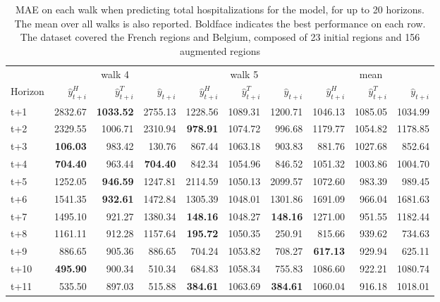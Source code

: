 \begin{table}[H]
\centering
\caption{MAE on each walk when predicting total hospitalizations for the model, for up to 20 horizons. The mean over all walks is also reported. Boldface indicates the best performance on each row. The dataset covered the French regions and Belgium, composed of 23 initial regions and 156 augmented regions }
\label{tab:MAE_walk_assemble}
\begin{tabular}{lrrrrrrrrr}
\toprule
 & \multicolumn{3}{c}{walk 4} & \multicolumn{3}{c}{walk 5} & \multicolumn{3}{c}{mean} 
\\

\cmidrule(lr){2-4} \cmidrule(lr){5-7} \cmidrule(lr){8-10} 
Horizon & $\hat{y}_{t+i}^H$ & $\hat{y}_{t+i}^T$ & $\hat{y}_{t+i}$ & $\hat{y}_{t+i}^H$ & $\hat{y}_{t+i}^T$ & $\hat{y}_{t+i}$ & $\hat{y}_{t+i}^H$ & $\hat{y}_{t+i}^T$ & $\hat{y}_{t+i}$ \\
\midrule
t+1  & 2832.67  & \textbf{1033.52}  & 2755.13  & 1228.56  & 1089.31  & 1200.71  & 1046.13  & 1085.05  & 1034.99  \\
t+2  & 2329.55  & 1006.71  & 2310.94  & \textbf{978.91}  & 1074.72  & 996.68  & 1179.77  & 1054.82  & 1178.85  \\
t+3  & \textbf{106.03}  & 983.42  & 130.76  & 867.44  & 1063.18  & 903.83  & 881.76  & 1027.68  & 852.64  \\
t+4  & \textbf{704.40}  & 963.44  & \textbf{704.40}  & 842.34  & 1054.96  & 846.52  & 1051.32  & 1003.86  & 1004.70  \\
t+5  & 1252.05  & \textbf{946.59}  & 1247.81  & 2114.59  & 1050.13  & 2099.57  & 1072.60  & 983.39  & 989.45  \\
t+6  & 1541.35  & \textbf{932.61}  & 1472.84  & 1305.39  & 1048.01  & 1301.86  & 1691.09  & 966.04  & 1681.63  \\
t+7  & 1495.10  & 921.27  & 1380.34  & \textbf{148.16}  & 1048.27  & \textbf{148.16}  & 1271.00  & 951.55  & 1182.44  \\
t+8  & 1161.11  & 912.28  & 1157.64  & \textbf{195.72}  & 1050.35  & 250.91  & 815.66  & 939.62  & 734.63  \\
t+9  & 886.65  & 905.36  & 886.65  & 704.24  & 1053.82  & 708.27  & \textbf{617.13}  & 929.94  & 625.11  \\
t+10  & \textbf{495.90}  & 900.34  & 510.34  & 684.83  & 1058.34  & 755.83  & 1086.60  & 922.21  & 1080.74  \\
t+11  & 535.50  & 897.03  & 515.88  & \textbf{384.61}  & 1063.69  & \textbf{384.61}  & 1060.04  & 916.18  & 1018.01  \\

\end{tabular}
\end{table}

